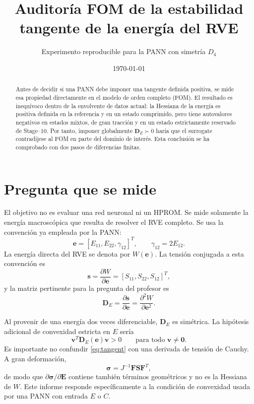 \documentclass[11pt,a4paper]{article}
\title{Auditoría FOM de la estabilidad tangente de la energía del RVE}
\author{Experimento reproducible para la PANN con simetría $D_4$}
\date{\today}
\begin{document}
\maketitle

\begin{abstract}
Antes de decidir si una PANN debe imponer una tangente definida positiva, se
mide esa propiedad directamente en el modelo de orden completo (FOM). El
resultado es inequívoco dentro de la envolvente de datos actual: la Hessiana de
la energía es positiva definida en la referencia y en un estado comprimido,
pero tiene autovalores negativos en estados mixtos, de gran tracción y en un
estado estrictamente reservado de Stage--10. Por tanto, imponer globalmente
$\bm D_E\succ0$ haría que el surrogate contradijese al FOM en parte del dominio
de interés. Esta conclusión se ha comprobado con dos pasos de diferencias
finitas.
\end{abstract}

\section{Pregunta que se mide}

El objetivo no es evaluar una red neuronal ni un HPROM. Se mide solamente la
energía macroscópica que resulta de resolver el RVE completo. Se usa la
convención ya empleada por la PANN:
\begin{equation}
 \bm e=[E_{11},E_{22},\gamma_{12}]^T,
 \qquad \gamma_{12}=2E_{12}.
\end{equation}
La energía directa del RVE se denota por $W(\bm e)$. La tensión conjugada a
esta convención es
\begin{equation}
 \bm s=\frac{\partial W}{\partial \bm e}
 =[S_{11},S_{22},S_{12}]^T,
\end{equation}
y la matriz pertinente para la pregunta del profesor es
\begin{equation}
 \bm D_E=\frac{\partial\bm s}{\partial\bm e}
 =\frac{\partial^2W}{\partial\bm e^2}.
 \label{eq:tangent}
\end{equation}

Al provenir de una energía dos veces diferenciable, $\bm D_E$ es simétrica. La
hipótesis adicional de convexidad estricta en $E$ sería
\begin{equation}
 \bm v^T\bm D_E(\bm e)\bm v>0
 \qquad\text{para todo }\bm v\neq\bm0.
 \label{eq:spd}
\end{equation}
Es importante no confundir \eqref{eq:tangent} con una derivada de tensión de
Cauchy. A gran deformación,
\begin{equation}
 \bm\sigma=J^{-1}\bm F\bm S\bm F^T,
\end{equation}
de modo que $\partial\bm\sigma/\partial\bm E$ contiene también términos
geométricos y no es la Hessiana de $W$. Este informe responde específicamente a
la condición de convexidad usada por una PANN con entrada $E$ o $C$.
\end{document}

